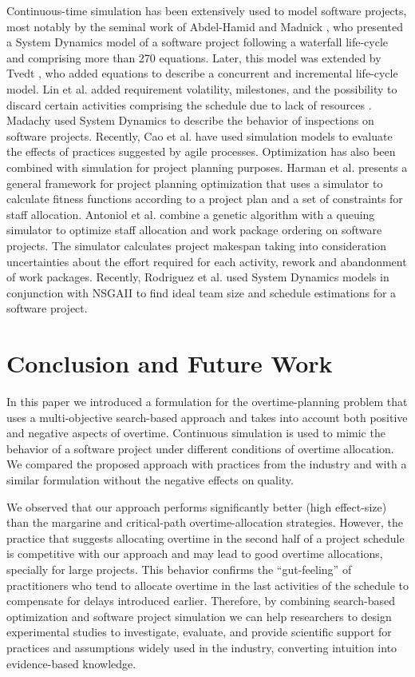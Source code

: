 \documentclass[conference]{IEEEtran}
\begin{document}
Continuous-time simulation has been extensively used to model software projects, most notably by the seminal work of Abdel-Hamid and Madnick \cite{Abdel-Hamid:1991}, who presented a System Dynamics model of a software project following a waterfall life-cycle and comprising more than 270 equations. Later, this model was extended by Tvedt  \cite{Tvedt:1996}, who added equations to describe a concurrent and incremental life-cycle model. Lin et al. added requirement volatility, milestones, and the possibility to discard certain activities comprising the schedule due to lack of resources \cite{Lin:1997}. Madachy \cite{Madachy:1996} used System Dynamics to describe the behavior of inspections on software projects. Recently, Cao et al. \cite{Cao:2010} have used simulation models to evaluate the effects of practices suggested by agile processes.
Optimization has also been combined with simulation for project planning purposes. Harman et al. \cite{harman:2009} presents a general framework for project planning optimization that uses a simulator to calculate fitness functions according to a project plan and a set of constraints for staff allocation. Antoniol et al. \cite{Antoniol:2004} combine a genetic algorithm with a queuing simulator to optimize staff allocation and work package ordering on software projects. The simulator calculates project makespan taking into consideration uncertainties about the effort required for each activity, rework and abandonment of work packages. Recently, Rodriguez et al. \cite{Rodriguez:2011} used System Dynamics models in conjunction with NSGAII to find ideal team size and schedule estimations for a software project.


\section{Conclusion and Future Work}
In this paper we introduced a formulation for the overtime-planning problem that uses a multi-objective search-based approach and takes into account both positive and negative aspects of overtime. Continuous simulation is used to mimic the behavior of a software project under different conditions of overtime allocation. We compared the proposed approach with practices from the industry and with a similar formulation without the negative effects on quality. 

We observed that our approach performs significantly better (high effect-size) than the margarine and critical-path overtime-allocation strategies. However, the practice that suggests allocating overtime in the second half of a project schedule is competitive with our approach and may lead to good overtime allocations, specially for large projects. This behavior confirms the “gut-feeling” of practitioners who tend to allocate overtime in the last activities of the schedule to compensate for delays introduced earlier. Therefore, by combining search-based optimization and software project simulation we can help researchers to design experimental studies to investigate, evaluate, and provide scientific support for practices and assumptions widely used in the industry, converting intuition into evidence-based knowledge. 
\end{document}
